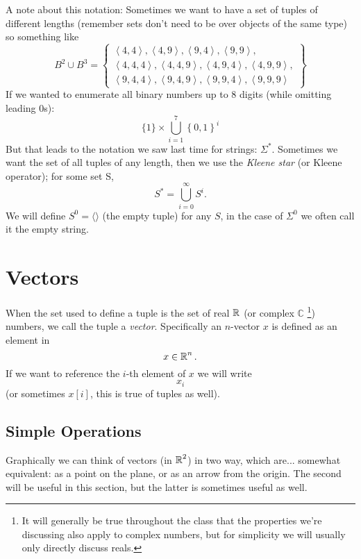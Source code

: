 \documentclass[11pt, oneside]{article}   	%
\begin{document}
A note about this notation:
Sometimes we want to have a set of tuples of different lengths (remember sets don't need to be over objects of the same type) 
so something like 
\[
B^2 \cup B^3 = \left\{  \begin{matrix}\left\langle 4,4 \right\rangle, \left\langle 4,9 \right\rangle,  \left\langle 9,4 \right\rangle, \left\langle 9,9 \right\rangle,\\
				\left\langle 4,4,4 \right\rangle, \left\langle 4,4,9 \right\rangle,  \left\langle 4,9,4 \right\rangle, \left\langle 4,9,9 \right\rangle,\\
				\left\langle 9,4,4 \right\rangle, \left\langle 9,4,9 \right\rangle,  \left\langle 9,9,4 \right\rangle, \left\langle 9,9,9 \right\rangle \end{matrix}\right\}
\]
If we wanted to enumerate all binary numbers up to 8 digits (while omitting leading 0s):
\[
\{1\} \times \bigcup_{i=1}^7 \left\{0,1\right\}^i
\]
But that leads to the notation we saw last time for strings: $\Sigma^*$.
Sometimes we want the set of all tuples of any length, then we use the \emph{Kleene star} (or Kleene operator); 
for some set S, 
\[
S^* =  \bigcup_{i=0}^\infty S^i.
\]
We will define $S^0 = \langle\rangle$ (the empty tuple) for any $S$, in the case of $\Sigma^0$ we often call it the empty string.

\section{Vectors}
When the set used to define a tuple is the set of real $\operatorname{\mathbb{R}}$ (or complex $\mathbb{C}$%
\footnote{It will generally be true throughout the class that the properties we're discussing also apply to complex numbers, but for simplicity we will usually only directly discuss reals.})
numbers, we call the tuple a \emph{vector}.
Specifically an $n$-vector $x$ is defined as an element in \[x\in \operatorname{\mathbb{R}}^n.\] 
If we want to reference the $i$-th element of $x$ we will write \[x_i\] (or sometimes $x[i]$, this is true of tuples as well).

\subsection{Simple Operations}
Graphically we can think of vectors (in $\operatorname{\mathbb{R}}^2$) in two way, which are... somewhat equivalent: 
as a point on the plane, or as an arrow from the origin.
The second will be useful in this section, but the latter is sometimes useful as well. 
\end{document}
